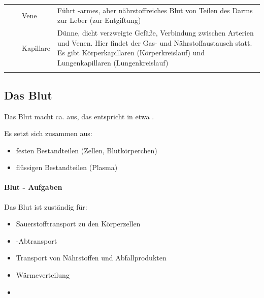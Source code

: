 \begin{gWideParEnv}
{\begin{tabulary}{\linewidth}{lllL}
 
&
&
Vene
&
Führt -armes, aber nährstoffreiches Blut von Teilen des Darms zur
Leber (zur Entgiftung)
\\\addlinespace
{} 
&
 
&
Kapillare
&
Dünne, dicht verzweigte Gefäße, Verbindung zwischen Arterien
und Venen. Hier findet der Gas- und Nährstoffaustausch statt. Es gibt
Körperkapillaren (Körperkreislauf) und Lungenkapillaren
(Lungenkreislauf)
\\\addlinespace\bottomrule
\end{tabulary}
}
\end{gWideParEnv}

\subsection{Das Blut}\label{topic:blut}

Das Blut macht ca.  aus,
das entspricht in etwa .

Es setzt sich zusammen aus:

\begin{itemize}
    \item festen Bestandteilen (Zellen, Blutkörperchen)
    \item flüssigen Bestandteilen (Plasma)
\end{itemize}

\begin{minipage}{\linewidth}
 
\end{minipage}


\paragraph{Blut - Aufgaben}

Das Blut ist zuständig für:
\begin{itemize}
    \item Sauerstofftransport zu den Körperzellen
    \item {}-Abtransport  
    \item Transport von Nährstoffen und Abfallprodukten
    \item Wärmeverteilung
    \item {}
\end{itemize}


